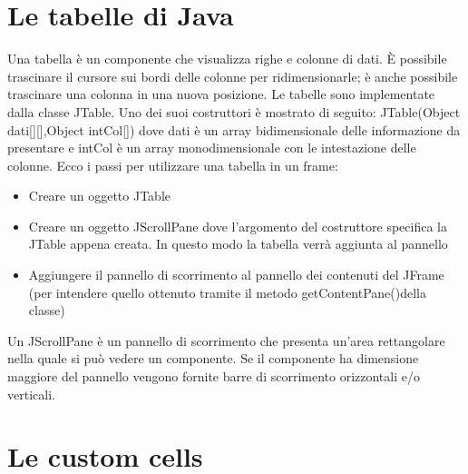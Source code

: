 \section{Le tabelle di Java}
Una tabella è un componente che visualizza righe e colonne di dati. È possibile trascinare il cursore sui bordi delle colonne per ridimensionarle; è anche possibile trascinare una colonna in una nuova posizione. Le tabelle sono implementate dalla classe JTable.
Uno dei suoi costruttori è mostrato di seguito:
JTable(Object dati[][],Object intCol[])
dove dati è un array bidimensionale delle informazione da presentare e intCol è un array
monodimensionale con le intestazione delle colonne.
Ecco i passi per utilizzare una tabella in un frame:
\begin{itemize}
\item Creare un oggetto JTable
\item Creare un oggetto JScrollPane dove l'argomento del costruttore specifica la JTable appena creata. In questo modo la tabella verrà aggiunta al pannello
\item Aggiungere il pannello di scorrimento al pannello dei contenuti del JFrame (per intendere quello ottenuto tramite il metodo getContentPane()della classe)
\end{itemize}
Un JScrollPane è un pannello di scorrimento che presenta un'area rettangolare nella quale si può vedere un componente. Se il componente ha dimensione maggiore del pannello vengono fornite barre di scorrimento orizzontali e/o verticali.

\section{Le custom cells}